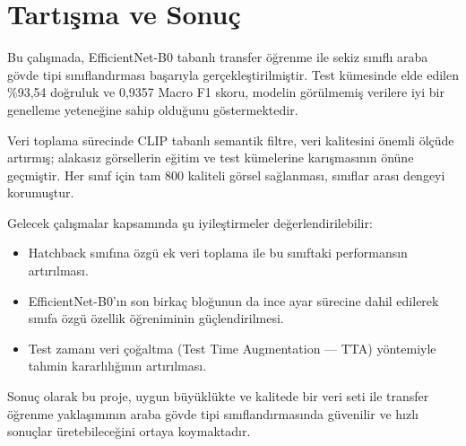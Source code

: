 \documentclass[conference]{IEEEtran}
\begin{document}
\section{Tartışma ve Sonuç}

Bu çalışmada, EfficientNet-B0 tabanlı transfer öğrenme ile sekiz sınıflı
araba gövde tipi sınıflandırması başarıyla gerçekleştirilmiştir. Test
kümesinde elde edilen \%93,54 doğruluk ve 0,9357 Macro F1 skoru, modelin
görülmemiş verilere iyi bir genelleme yeteneğine sahip olduğunu
göstermektedir.

Veri toplama sürecinde CLIP tabanlı semantik filtre, veri kalitesini önemli
ölçüde artırmış; alakasız görsellerin eğitim ve test kümelerine karışmasının
önüne geçmiştir. Her sınıf için tam 800 kaliteli görsel sağlanması,
sınıflar arası dengeyi korumuştur.

Gelecek çalışmalar kapsamında şu iyileştirmeler değerlendirilebilir:
\begin{itemize}
  \item Hatchback sınıfına özgü ek veri toplama ile bu sınıftaki
        performansın artırılması.
  \item EfficientNet-B0'ın son birkaç bloğunun da ince ayar sürecine dahil
        edilerek sınıfa özgü özellik öğreniminin güçlendirilmesi.
  \item Test zamanı veri çoğaltma (Test Time Augmentation — TTA)
        yöntemiyle tahmin kararlılığının artırılması.
\end{itemize}

Sonuç olarak bu proje, uygun büyüklükte ve kalitede bir veri seti ile
transfer öğrenme yaklaşımının araba gövde tipi sınıflandırmasında
güvenilir ve hızlı sonuçlar üretebileceğini ortaya koymaktadır.



\end{document}
